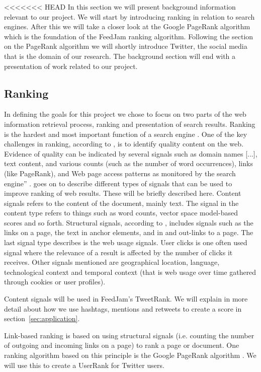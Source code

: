 <<<<<<< HEAD
In this section we will present background information relevant to our project. We will start by introducing ranking in relation to search engines. After this we will take a closer look at the Google PageRank algorithm which is the foundation of the FeedJam ranking algorithm.  Following the section on the PageRank algorithm we will shortly introduce Twitter, the social media that is the domain of our research. The background section will end with a presentation of work related to our project.

\subsection{Ranking} 
In defining the goals for this project we chose to focus on two parts of the web information retrieval process, ranking and presentation of search results. Ranking is the hardest and most important function of a search engine \cite[p.469]{Baeza-Yates2011}. One of the key challenges in ranking, according to \citet{Baeza-Yates2011}, is to identify quality content on the web. Evidence of quality can be indicated by several signals such as domain names [...], text content, and various counts (such as the number of word occurrences), links (like PageRank), and Web page access patterns as monitored by the search engine” \citep[p.468]{Baeza-Yates2011}. \citet{Baeza-Yates2011} goes on to describe different types of signals that can be used to improve ranking of web results. These will be briefly described here. Content signals refers to the content of the document, mainly text. The signal in the content type refers to things such as word counts, vector space model-based scores and so forth. Structural signals, according to \citet{Baeza-Yates2011}, includes signals such as the links on a page, the text in anchor elements, and in and out-links to a page.  The last signal type describes is the web usage signals. User clicks is one often used signal where the relevance of a result is affected by the number of clicks it receives. Other signals mentioned are geographical location, language, technological context and temporal context (that is web usage over time gathered through cookies or user profiles)\citep{Baeza-Yates2011}.

Content signals will be used in FeedJam's TweetRank. We will explain in more detail about how we use hashtags, mentions and retweets to create a score in section~\ref{sec:application}.

Link-based ranking is based on using structural signals (i.e. counting the number of outgoing and incoming links on a page) to rank a page or document. One ranking algorithm based on this  principle is the Google PageRank algorithm \citep{Page1999}. We will use this to create a UserRank for Twitter users. 

